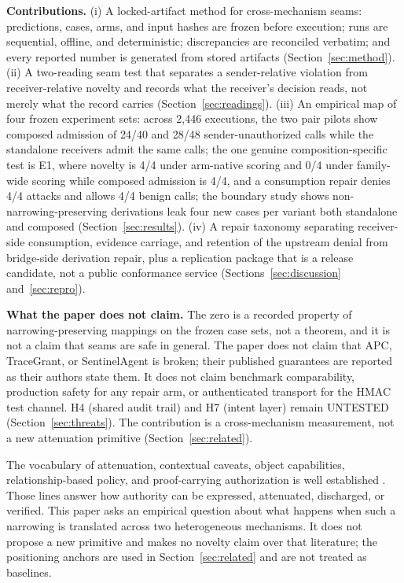 \documentclass[sigconf,anonymous,nonacm]{acmart}
\newcommand{\status}[1]{\textsc{#1}}
\begin{document}
\textbf{Contributions.} (i) A locked-artifact method for cross-mechanism seams: predictions, cases, arms, and input hashes are frozen before execution; runs are sequential, offline, and deterministic; discrepancies are reconciled verbatim; and every reported number is generated from stored artifacts (Section~\ref{sec:method}). (ii) A two-reading seam test that separates a sender-relative violation from receiver-relative novelty and records what the receiver's decision reads, not merely what the record carries (Section~\ref{sec:readings}). (iii) An empirical map of four frozen experiment sets: across 2,446 executions, the two pair pilots show composed admission of 24/40 and 28/48 sender-unauthorized calls while the standalone receivers admit the same calls; the one genuine composition-specific test is E1, where novelty is 4/4 under arm-native scoring and 0/4 under family-wide scoring while composed admission is 4/4, and a consumption repair denies 4/4 attacks and allows 4/4 benign calls; the boundary study shows non-narrowing-preserving derivations leak four new cases per variant both standalone and composed (Section~\ref{sec:results}). (iv) A repair taxonomy separating receiver-side consumption, evidence carriage, and retention of the upstream denial from bridge-side derivation repair, plus a replication package that is a release candidate, not a public conformance service (Sections~\ref{sec:discussion} and~\ref{sec:repro}).

\textbf{What the paper does not claim.} The zero is a recorded property of narrowing-preserving mappings on the frozen case sets, not a theorem, and it is not a claim that seams are safe in general. The paper does not claim that APC, TraceGrant, or SentinelAgent is broken; their published guarantees are reported as their authors state them. It does not claim benchmark comparability, production safety for any repair arm, or authenticated transport for the HMAC test channel. H4 (shared audit trail) and H7 (intent layer) remain \status{UNTESTED} (Section~\ref{sec:threats}). The contribution is a cross-mechanism measurement, not a new attenuation primitive (Section~\ref{sec:related}).

The vocabulary of attenuation, contextual caveats, object capabilities, relationship-based policy, and proof-carrying authorization is well established \cite{macaroons,miller,fong,appel,rfc8693,rfc9396}. Those lines answer how authority can be expressed, attenuated, discharged, or verified. This paper asks an empirical question about what happens when such a narrowing is translated across two heterogeneous mechanisms. It does not propose a new primitive and makes no novelty claim over that literature; the positioning anchors are used in Section~\ref{sec:related} and are not treated as baselines.
\end{document}
